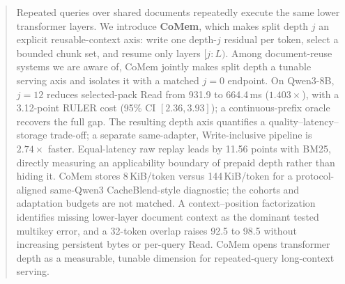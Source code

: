 \begin{abstract}
Repeated queries over shared documents repeatedly execute the same lower
transformer layers. We introduce \textbf{CoMem}, which makes split depth $j$ an
explicit reusable-context axis: write one depth-$j$ residual per token, select a
bounded chunk set, and resume only layers $[j{:}L)$. Among document-reuse
systems we are aware of, CoMem jointly makes split depth a tunable serving axis
and isolates it with a matched $j{=}0$ endpoint. On Qwen3-8B, $j{=}12$ reduces
selected-pack Read from 931.9 to 664.4\,ms ($1.403\times$), with a 3.12-point
RULER cost (95\% CI $[2.36,3.93]$); a continuous-prefix oracle recovers the full
gap. The resulting depth axis quantifies a quality--latency--storage trade-off;
a separate same-adapter, Write-inclusive pipeline is $2.74\times$ faster.
Equal-latency raw replay leads by 11.56 points with BM25, directly measuring an
applicability boundary of prepaid depth rather than hiding it. CoMem stores
8\,KiB/token versus 144\,KiB/token for a protocol-aligned same-Qwen3
CacheBlend-style diagnostic; the cohorts and adaptation budgets are not
matched. A context--position
factorization identifies missing lower-layer document context as the dominant
tested multikey error, and a 32-token overlap raises 92.5 to 98.5 without
increasing persistent bytes or per-query Read. CoMem opens transformer depth as
a measurable, tunable dimension for repeated-query long-context serving.
\end{abstract}

